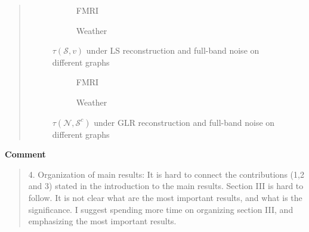 \documentclass[11pt,onecolumn,journal]{IEEEtran}
\theoremstyle{definition}
\newcommand{\set}[1]{\mathcal{#1}}
\begin{document}
\begin{quote}
\begin{figure}[h!]%
    \centering
    \begin{subfigure}{0.4\columnwidth}
    \caption{FMRI}
    \label{tau_FMRI_LS_}
    \end{subfigure}\hfill
    \begin{subfigure}{0.4\columnwidth}
    \caption{Weather}
    \label{GLR_MSE_subfigb}%
    \end{subfigure}
    
    \caption{$\tau(\set{S},v)$ under LS reconstruction and full-band noise on different graphs }
\label{fig:LS_tau_real}
\end{figure}

\begin{figure}[h!]%
    \centering
    \begin{subfigure}{0.4\columnwidth}
    \caption{FMRI}
    \label{tau_FMRI_LS}
    \end{subfigure}\hfill
    \begin{subfigure}{0.4\columnwidth}
    \caption{Weather}
    \label{GLR_MSE_subfigb}%
    \end{subfigure}
    \caption{$\tau(\set{N},\set{S}^{c})$ under GLR reconstruction and full-band noise on different graphs }
\label{fig:GLR_tau_real}
\end{figure}
\end{quote}

\clearpage
\textbf{Comment}
\begin{quote}
4. Organization of main results:  It is hard to connect the contributions (1,2 and 3) stated in the introduction to the main results. Section III is hard to follow. It is not clear what are the most important results, and what is the significance. I suggest spending more time on organizing section III, and emphasizing the most important results.
\end{quote}
\end{document}

